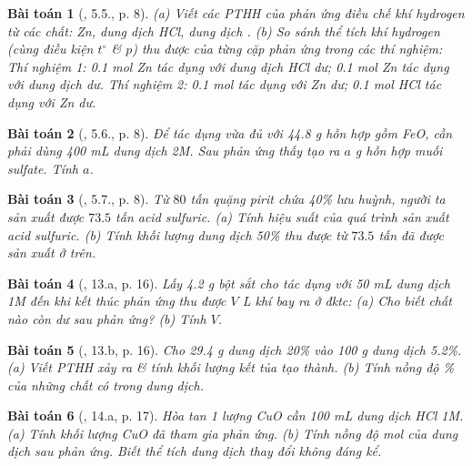 \documentclass{article}
\newtheorem{baitoan}{Bài toán}
\begin{document}
\begin{baitoan}[\cite{SBT_Hoa_Hoc_9}, 5.5., p. 8]
	(a) Viết các PTHH của phản ứng điều chế khí hydrogen từ các chất: \emph{Zn}, dung dịch \emph{HCl}, dung dịch \emph{}. (b) So sánh thể tích khí hydrogen (cùng điều kiện $t^\circ$ \& $p$) thu được của từng cặp phản ứng trong các thí nghiệm: Thí nghiệm 1: \emph{0.1 mol Zn} tác dụng với dung dịch \emph{HCl} dư; \emph{0.1 mol Zn} tác dụng với dung dịch \emph{} dư.	Thí nghiệm 2: \emph{0.1 mol } tác dụng với \emph{Zn} dư; \emph{0.1 mol HCl} tác dụng với \emph{Zn} dư.
\end{baitoan}

\begin{baitoan}[\cite{SBT_Hoa_Hoc_9}, 5.6., p. 8]
	Để tác dụng vừa đủ với \emph{44.8 g} hỗn hợp gồm \emph{FeO, } cần phải dùng \emph{400 mL} dung dịch \emph{ 2M}. Sau phản ứng thấy tạo ra $a$ \emph{g} hỗn hợp muối sulfate. Tính $a$.
\end{baitoan}

\begin{baitoan}[\cite{SBT_Hoa_Hoc_9}, 5.7., p. 8]
	Từ $80$ tấn quặng pirit chứa \emph{40\%} lưu huỳnh, người ta sản xuất được $73.5$ tấn acid sulfuric. (a) Tính hiệu suất của quá trình sản xuất acid sulfuric. (b) Tính khối lượng dung dịch \emph{ 50\%} thu được từ $73.5$ tấn \emph{} đã được sản xuất ở trên.
\end{baitoan}

\begin{baitoan}[\cite{An_350_BT_Hoa_Hoc_9}, 13.a, p. 16]
	Lấy \emph{4.2 g} bột sắt cho tác dụng với \emph{50 mL} dung dịch \emph{ 1M} đến khi kết thúc phản ứng thu được $V$ \emph{L} khí \emph{} bay ra ở đktc: (a) Cho biết chất nào còn dư sau phản ứng? (b) Tính $V$.
\end{baitoan}

\begin{baitoan}[\cite{An_350_BT_Hoa_Hoc_9}, 13.b, p. 16]
	Cho \emph{29.4 g} dung dịch \emph{ 20\%} vào \emph{100 g} dung dịch \emph{ 5.2\%}. (a) Viết PTHH xảy ra \& tính khối lượng kết tủa tạo thành. (b) Tính nồng độ \% của những chất có trong dung dịch.
\end{baitoan}

\begin{baitoan}[\cite{An_350_BT_Hoa_Hoc_9}, 14.a, p. 17]
	Hòa tan 1 lượng \emph{CuO} cần \emph{100 mL} dung dịch \emph{HCl 1M}. (a) Tính khối lượng \emph{CuO} đã tham gia phản ứng. (b) Tính nồng độ mol của dung dịch sau phản ứng. Biết thể tích dung dịch thay đổi không đáng kể.
\end{baitoan}
\end{document}
